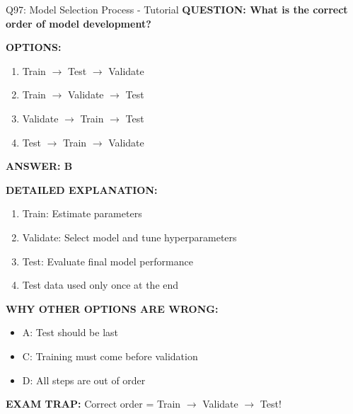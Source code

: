 \documentclass[8pt]{beamer}
\begin{document}
	\begin{frame}{Q97: Model Selection Process - Tutorial}
		\fontsize{6.5}{7.5}\selectfont
		\textbf{QUESTION: What is the correct order of model development?}
		
		\vspace{0.1cm}
		\textbf{OPTIONS:}
		\begin{enumerate}
			\item Train $\to$ Test $\to$ Validate
			\item Train $\to$ Validate $\to$ Test
			\item Validate $\to$ Train $\to$ Test
			\item Test $\to$ Train $\to$ Validate
		\end{enumerate}
		
		\vspace{0.1cm}
		\textcolor{myblue}{\textbf{ANSWER: B}}
		
		\vspace{0.1cm}
		\textbf{DETAILED EXPLANATION:}
		\begin{enumerate}
			\item Train: Estimate parameters
			\item Validate: Select model and tune hyperparameters
			\item Test: Evaluate final model performance
			\item Test data used only once at the end
		\end{enumerate}
		
		\vspace{0.1cm}
		\textcolor{myred}{\textbf{WHY OTHER OPTIONS ARE WRONG:}}
		\begin{itemize}
			\item \textcolor{myred}{A:} Test should be last
			\item \textcolor{myred}{C:} Training must come before validation
			\item \textcolor{myred}{D:} All steps are out of order
		\end{itemize}
		
		\textcolor{myred}{\textbf{EXAM TRAP:}} Correct order = \textcolor{myblue}{Train $\to$ Validate $\to$ Test}!
	\end{frame}
	
\end{document}
